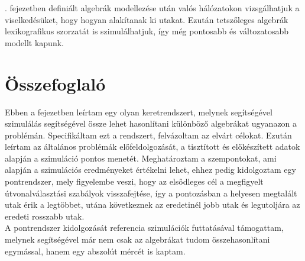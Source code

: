   . fejezetben definiált algebrák modellezése után valós hálózatokon vizsgálhatjuk a viselkedésüket, hogy hogyan alakítanak ki utakat. Ezután tetszőleges algebrák lexikografikus szorzatát is szimulálhatjuk, így még pontosabb és változatosabb modellt kapunk.


  \section{Összefoglaló}
  Ebben a fejezetben leírtam egy olyan keretrendszert, melynek segítségével szimulálás segítségével össze lehet hasonlítani különböző algebrákat ugyanazon a problémán. Specifikáltam ezt a rendszert, felvázoltam az elvárt célokat. Ezután leírtam az általános problémák előfeldolgozását, a tisztított és előkészített adatok alapján a szimuláció pontos menetét. Meghatároztam a szempontokat, ami alapján a szimulációs eredményeket értékelni lehet, ehhez pedig kidolgoztam egy pontrendszer, mely figyelembe veszi, hogy az elsődleges cél a megfigyelt útvonalválasztási szabályok visszafejtése, így a pontozásban a helyesen megtalált utak érik a legtöbbet, utána következnek az eredetinél jobb utak és legutoljára az eredeti rosszabb utak.\\
  A pontrendszer kidolgozását referencia szimulációk futtatásával támogattam, melynek segítségével már nem csak az algebrákat tudom összehasonlítani egymással, hanem egy abszolút mércét is kaptam.
